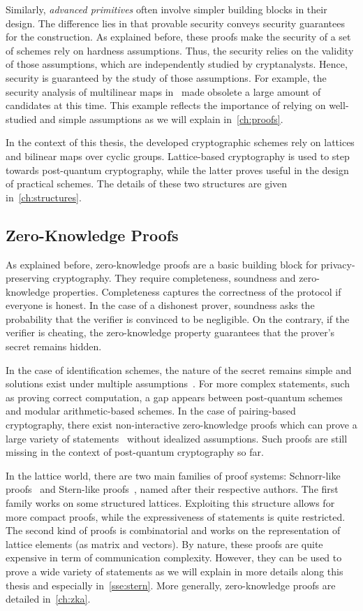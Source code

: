 Similarly, \textit{advanced primitives} often involve simpler building blocks in their design.
The difference lies in that provable security conveys security guarantees for the construction.
As explained before, these proofs make the security of a set of schemes rely on hardness assumptions.
Thus, the security relies on the validity of those assumptions, which are independently studied by cryptanalysts.
Hence, security is guaranteed by the study of those assumptions.
For example, the security analysis of multilinear maps in~\cite{CHL+15} made obsolete a large amount of candidates at this time.
This example reflects the importance of relying on well-studied and simple assumptions as we will explain in~\cref{ch:proofs}.

In the context of this thesis, the developed cryptographic schemes rely on lattices and bilinear maps over cyclic groups.
Lattice-based cryptography is used to step towards post-quantum cryptography, while the latter proves useful in the design of practical schemes.
The details of these two structures are given in~\cref{ch:structures}.

\subsection{Zero-Knowledge Proofs}

As explained before, zero-knowledge proofs are a basic building block for privacy-preserving cryptography.
They require completeness, soundness and zero-knowledge properties.
Completeness captures the correctness of the protocol if everyone is honest. In the case of a dishonest prover, soundness asks the probability that the verifier is convinced to be negligible.
On the contrary, if the verifier is cheating, the zero-knowledge property guarantees that the prover's secret remains hidden. 

In the case of identification schemes, the nature of the secret remains simple and solutions exist under multiple assumptions~\cite{Sch96,Ste96,KTX08,Lyu08}.
For more complex statements, such as proving correct computation, a gap appears between post-quantum schemes and modular arithmetic-based schemes.
In the case of pairing-based cryptography, there exist non-interactive zero-knowledge proofs which can prove a large variety of statements~\cite{GOS06,GS08} without idealized assumptions.
Such proofs are still missing in the context of post-quantum cryptography so far.

In the lattice world, there are two main families of proof systems: Schnorr-like proofs~\cite{Sch96,Lyu09} and Stern-like proofs~\cite{Ste96}, named after their respective authors.
The first family works on some structured lattices. Exploiting this structure allows for more compact proofs, while the expressiveness of statements is quite restricted.
The second kind of proofs is combinatorial and works on the representation of lattice elements (as matrix and vectors).
By nature, these proofs are quite expensive in term of communication complexity.
However, they can be used to prove a wide variety of statements as we will explain in more details along this thesis and especially in~\cref{sse:stern}.
More generally, zero-knowledge proofs are detailed in~\cref{ch:zka}.

